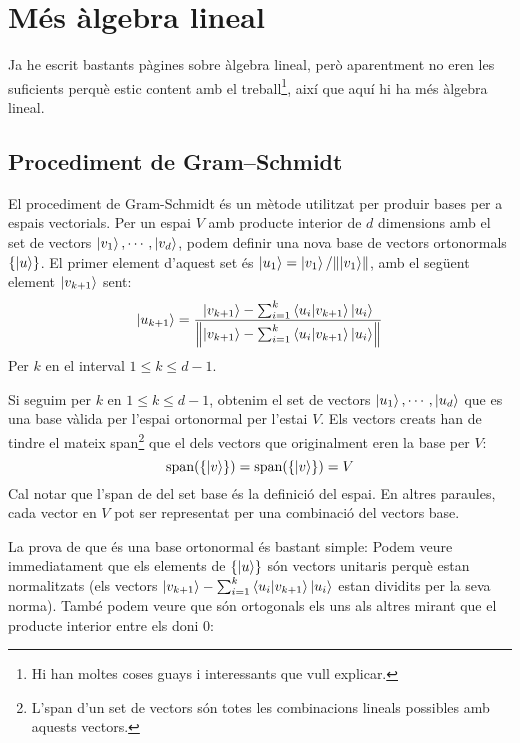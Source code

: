\chapter{Més àlgebra lineal}
Ja he escrit bastants pàgines sobre àlgebra lineal, però aparentment no eren les suficients perquè estic content amb el treball\footnote{Hi han moltes coses guays i interessants que vull explicar.}, així que aquí hi ha més àlgebra lineal.


\section{Procediment de Gram–Schmidt}\label{gram}
El procediment de Gram-Schmidt és un mètode utilitzat per produir bases per a espais vectorials\cite{QCandQI:GramSchmidt}. Per un espai $V$ amb producte interior de $d$ dimensions amb el set de vectors ${\ket{v_1}, \cdots, \ket{v_d}}$, podem definir una nova base de vectors ortonormals $\{\ket{u}\}$. El primer element d'aquest set és $\ket{u_1} = \ket{v_1}/\norm{\ket{v_1}}$, amb el següent element $\ket{v_{k+1}}$ sent:
$$
\ket{u_{k+1}} = \frac{\ket{v_{k+1}} - \sum_{i=1}^{k} \bra{u_i}\ket{v_{k+1}}\ket{u_i}}{\norm{\ket{v_{k+1}} - \sum_{i=1}^{k} \bra{u_i}\ket{v_{k+1}}\ket{u_i}}}
$$
Per $k$ en el interval $1 \leq k \leq d-1$.

Si seguim per $k$ en $1 \leq k \leq d-1$, obtenim el set de vectors ${\ket{u_1}, \cdots , \ket{u_d}}$ que es una base vàlida per l'espai ortonormal per l'estai $V$. Els vectors creats han de tindre el mateix span\footnote{L'span d'un set de vectors són totes les combinacions lineals possibles amb aquests vectors.} que el dels vectors que originalment eren la base per $V$:
$$
\text{span}(\{\ket{v}\}) = \text{span}(\{\ket{v}\}) = V
$$
Cal notar que l'span de del set base és la definició del espai. En altres paraules, cada vector en $V$ pot ser representat per una combinació del vectors base. 

La prova de que és una base ortonormal és bastant simple:
Podem veure immediatament que els elements  de $\{ \ket{u} \}$ són vectors unitaris perquè estan normalitzats (els vectors $\ket{v_{k+1}} - \sum_{i=1}^{k} \bra{u_i}\ket{v_{k+1}}\ket{u_i}$ estan dividits per la seva norma). També podem veure que són ortogonals els uns als altres mirant que el producte interior entre els doni 0:

